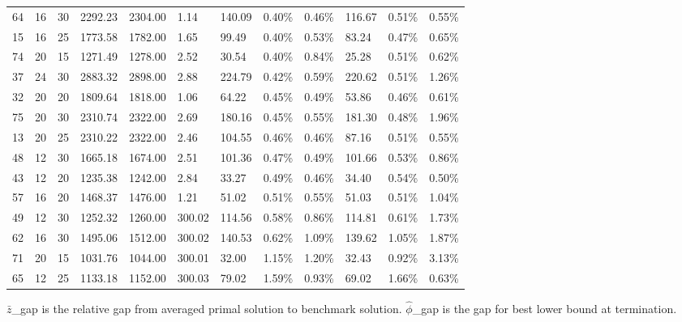 \documentclass[../main]{subfiles}
\begin{document}
\begin{longtable}{l|ll|lll|lll|lll}
   64 & 16                         & 30                         & 2292.23                   & 2304.00  & 1.14                & 140.09 & 0.40\%  & 0.46\% & 116.67 & 0.51\%  & 0.55\% \\
   15 & 16                         & 25                         & 1773.58                   & 1782.00  & 1.65                & 99.49  & 0.40\%  & 0.53\% & 83.24  & 0.47\%  & 0.65\% \\
   74 & 20                         & 15                         & 1271.49                   & 1278.00  & 2.52                & 30.54  & 0.40\%  & 0.84\% & 25.28  & 0.51\%  & 0.62\% \\
   37 & 24                         & 30                         & 2883.32                   & 2898.00  & 2.88                & 224.79 & 0.42\%  & 0.59\% & 220.62 & 0.51\%  & 1.26\% \\
   32 & 20                         & 20                         & 1809.64                   & 1818.00  & 1.06                & 64.22  & 0.45\%  & 0.49\% & 53.86  & 0.46\%  & 0.61\% \\
   75 & 20                         & 30                         & 2310.74                   & 2322.00  & 2.69                & 180.16 & 0.45\%  & 0.55\% & 181.30 & 0.48\%  & 1.96\% \\
   13 & 20                         & 25                         & 2310.22                   & 2322.00  & 2.46                & 104.55 & 0.46\%  & 0.46\% & 87.16  & 0.51\%  & 0.55\% \\
   48 & 12                         & 30                         & 1665.18                   & 1674.00  & 2.51                & 101.36 & 0.47\%  & 0.49\% & 101.66 & 0.53\%  & 0.86\% \\
   43 & 12                         & 20                         & 1235.38                   & 1242.00  & 2.84                & 33.27  & 0.49\%  & 0.46\% & 34.40  & 0.54\%  & 0.50\% \\
   57 & 16                         & 20                         & 1468.37                   & 1476.00  & 1.21                & 51.02  & 0.51\%  & 0.55\% & 51.03  & 0.51\%  & 1.04\% \\
   49 & 12                         & 30                         & 1252.32                   & 1260.00  & 300.02              & 114.56 & 0.58\%  & 0.86\% & 114.81 & 0.61\%  & 1.73\% \\
   62 & 16                         & 30                         & 1495.06                   & 1512.00  & 300.02              & 140.53 & 0.62\%  & 1.09\% & 139.62 & 1.05\%  & 1.87\% \\
   71 & 20                         & 15                         & 1031.76                   & 1044.00  & 300.01              & 32.00  & 1.15\%  & 1.20\% & 32.43  & 0.92\%  & 3.13\% \\
   65 & 12                         & 25                         & 1133.18                   & 1152.00  & 300.03              & 79.02  & 1.59\%  & 0.93\% & 69.02  & 1.66\%  & 0.63\% \\
   \bottomrule
\end{longtable}

\small
$\bar z$\_gap is the relative gap from averaged primal solution to benchmark solution.
$\hat \phi$\_gap is the gap for best lower bound at termination.

\normalsize
\end{document}
